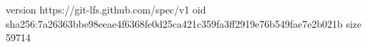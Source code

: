 version https://git-lfs.github.com/spec/v1
oid sha256:7a26363bbe98eeae4f6368fe0d25ca421c359fa3ff2919e76b549fae7e2b021b
size 59714
